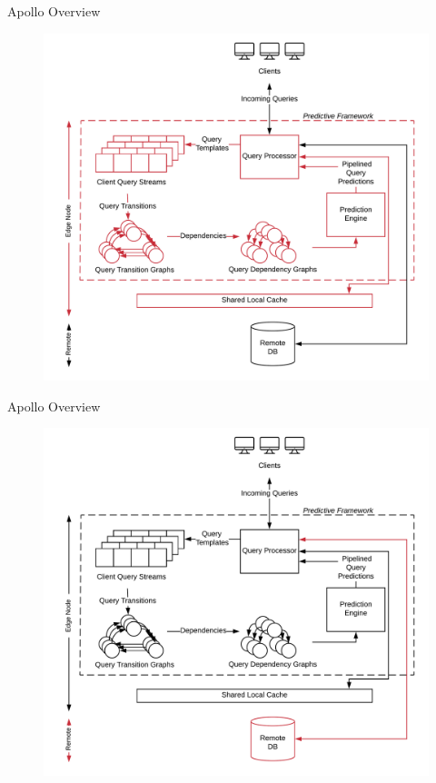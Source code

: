\documentclass[10pt]{beamer}
\begin{document}
\begin{frame}[fragile]{Apollo Overview}
    \begin{figure}
        \hspace*{-1cm}
        \includegraphics[scale=0.13]{apollo_overview_6}
    \end{figure}
\end{frame}

\begin{frame}[fragile]{Apollo Overview}
    \begin{figure}
        \hspace*{-1cm}
        \includegraphics[scale=0.13]{apollo_overview_7}
    \end{figure}
\end{frame}
\end{document}
